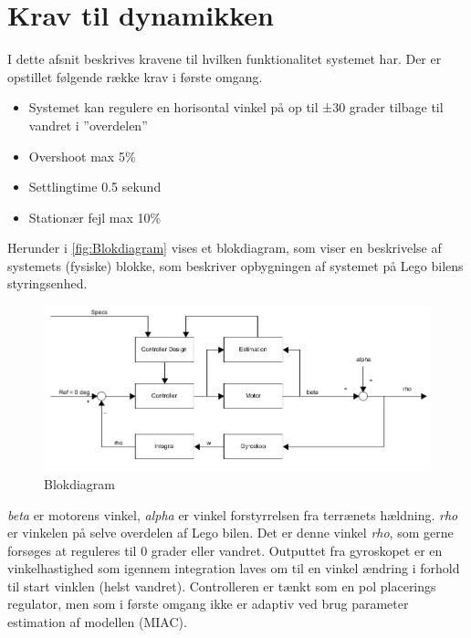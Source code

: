 \section{Krav til dynamikken}

I dette afsnit beskrives kravene til hvilken funktionalitet systemet har. Der er opstillet følgende række krav i første omgang.
\begin{itemize}
	\item Systemet kan regulere en horisontal vinkel på op til ±30 grader tilbage til vandret i ”overdelen”
	\item Overshoot max 5\%
	\item Settlingtime 0.5 sekund 
	\item Stationær fejl max 10\%  
	
\end{itemize}



Herunder i \autoref{fig:Blokdiagram} vises et blokdiagram, som viser en beskrivelse af systemets (fysiske) blokke, som beskriver opbygningen af systemet på Lego bilens styringsenhed. 


\begin{figure}[H]
	\centering
	\includegraphics[width = 400 pt]{figur/blokdiagram.png}
	\caption{Blokdiagram}
	\label{fig:Blokdiagram}
\end{figure}

\textit{beta} er motorens vinkel,\textit{ alpha} er vinkel forstyrrelsen fra terrænets hældning. \textit{rho} er vinkelen på selve overdelen af Lego bilen. Det er denne vinkel \textit{rho}, som gerne forsøges at reguleres til 0 grader eller vandret. Outputtet fra gyroskopet er en vinkelhastighed som igennem integration laves om til en vinkel ændring i forhold til start vinklen (helst vandret). Controlleren er tænkt som en pol placerings regulator, men som i første omgang ikke er adaptiv ved brug parameter estimation af modellen (MIAC). 